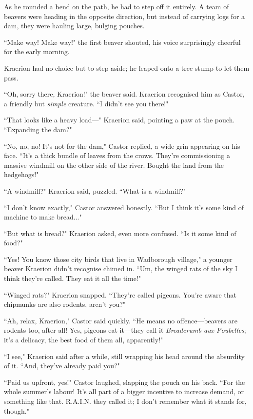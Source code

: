 As he rounded a bend on the path, he had to step off it entirely.
A team of beavers were heading in the opposite direction, but instead of carrying logs for a dam, they were hauling large, bulging pouches.

``Make way! Make way!" the first beaver shouted, his voice surprisingly cheerful for the early morning.

Kraerion had no choice but to step aside; he leaped onto a tree stump to let them pass.

``Oh, sorry there, Kraerion!" the beaver said.
Kraerion recognised him as Castor, a friendly but \textit{simple} creature.
``I didn't see you there!"

``That looks like a heavy load---" Kraerion said, pointing a paw at the pouch.
``Expanding the dam?"

``No, no, no! It's not for the dam," Castor replied, a wide grin appearing on his face.
``It's a thick bundle of leaves from the crows.
They're commissioning a massive windmill on the other side of the river.
Bought the land from the hedgehogs!"

``A windmill?" Kraerion said, puzzled.
``What is a windmill?"

``I don't know exactly," Castor answered honestly.
``But I think it's some kind of machine to make bread..."

``But what is bread?" Kraerion asked, even more confused.
``Is it some kind of food?"

``Yes!
You know those city birds that live in Wadborough village," a younger beaver Kraerion didn't recognise chimed in.
``Um, the winged rats of the sky I think they're called.
They eat it all the time!"

``Winged rats?" Kraerion snapped.
``They're called pigeons.
You're aware that chipmunks are also rodents, aren't you?"

``Ah, relax, Kraerion," Castor said quickly.
``He means no offence---beavers are rodents too, after all!
Yes, pigeons eat it---they call it \textit{Breadcrumb aux Poubelles}; it's a delicacy, the best food of them all, apparently!"

``I see," Kraerion said after a while, still wrapping his head around the absurdity of it.
``And, they've already paid you?"

``Paid us upfront, yes!" Castor laughed, slapping the pouch on his back.
``For the whole summer's labour!
It's all part of a bigger incentive to increase demand, or something like that.
R.A.I.N. they called it; I don't remember what it stands for, though."

